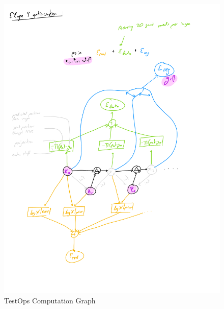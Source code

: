 \begin{figure}[h!]
    \centering
    \includegraphics[width=1\textwidth]{Figures/humor/improvement/computation_graph_humor.png}
    \caption{TestOps Computation Graph}
    \label{fig:humor_rollout_graph}
\end{figure}


